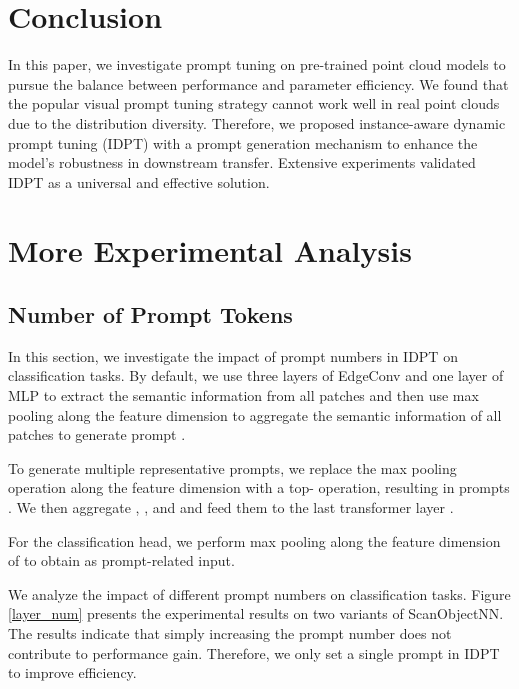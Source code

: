 \documentclass[10pt,twocolumn,letterpaper]{article}
\begin{document}
\section{Conclusion}

In this paper, we investigate prompt tuning on pre-trained point cloud models to pursue the balance between performance and parameter efficiency. We found that the popular visual prompt tuning strategy cannot work well in real point clouds due to the distribution diversity. Therefore, we proposed instance-aware dynamic prompt tuning (IDPT) with a prompt generation mechanism to enhance the model's robustness in downstream transfer. Extensive experiments validated IDPT as a universal and effective solution.


\balance
{\small


}



\clearpage
\appendix
\section{More Experimental Analysis}

\subsection{Number of Prompt Tokens}

In this section, we investigate the impact of prompt numbers in IDPT on classification tasks. By default, we use three layers of EdgeConv \cite{wang2019dynamic} and one layer of MLP to extract the semantic information  from all patches and then use max pooling along the feature dimension to aggregate the semantic information of all patches to generate prompt . 

To generate multiple representative prompts, we replace the max pooling operation along the feature dimension with a top- operation, resulting in  prompts . We then aggregate , , and  and feed them to the last transformer layer .


For the classification head, we perform max pooling along the feature dimension of  to obtain  as prompt-related input. 

We analyze the impact of different prompt numbers on classification tasks. Figure \ref{layer_num} presents the experimental results on two variants of ScanObjectNN. The results indicate that simply increasing the prompt number does not contribute to performance gain.  Therefore, we only set a single prompt in IDPT to improve efficiency.
\end{document}
